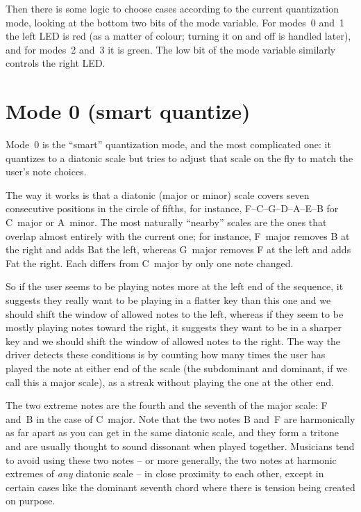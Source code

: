 Then there is some logic to choose cases according to the current
quantization mode, looking at the bottom two bits of the mode variable.  For
modes~0 and~1 the left LED is red (as a matter of colour; turning it on and
off is handled later), and for modes~2 and~3 it is green.  The low bit of
the mode variable similarly controls the right LED.

\section{Mode 0 (smart quantize)}

Mode~0 is the ``smart'' quantization mode, and the most complicated one:  it
quantizes to a diatonic scale but tries to adjust that scale on the fly to
match the user's note choices.

The way it works is that a diatonic (major or minor) scale covers seven
consecutive positions in the circle of fifths, for instance,
F--C--G--D--A--E--B for C~major or A~minor.  The most naturally ``nearby''
scales are the ones that overlap almost entirely with the current one; for
instance, F~major removes B at the right and adds B\musFlat at the left,
whereas G~major removes F at the left and adds F\musSharp at the right. 
Each differs from C~major by only one note changed.

So if the user seems to be playing notes more at the left end of the
sequence, it suggests they really want to be playing in a flatter key than
this one and we should shift the window of allowed notes to the left,
whereas if they seem to be mostly playing notes toward the right, it
suggests they want to be in a sharper key and we should shift the window of
allowed notes to the right.  The way the driver detects these conditions is
by counting how many times the user has played the note at either end of the
scale (the subdominant and dominant, if we call this a major scale), as a
streak without playing the one at the other end.

The two extreme notes are the fourth and the seventh of the major scale: F
and~B in the case of C~major.  Note that the two notes B and~F are
harmonically as far apart as you can get in the same diatonic scale, and
they form a tritone and are usually thought to sound dissonant when played
together.  Musicians tend to avoid using these two notes -- or more
generally, the two notes at harmonic extremes of \emph{any} diatonic scale
-- in close proximity to each other, except in certain cases like the
dominant seventh chord where there is tension being created on purpose.

